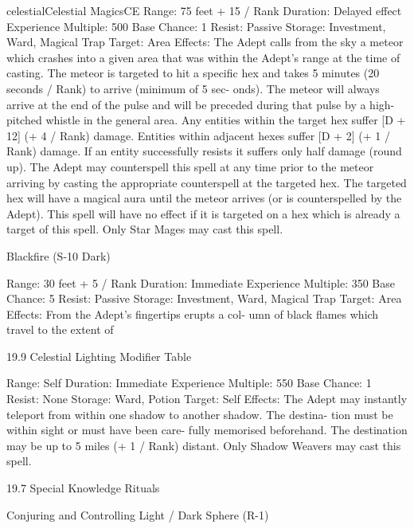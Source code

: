 \begin{College}[1.3]{celestial}{Celestial Magics}{CE}
Range: 75 feet + 15 / Rank 
Duration: Delayed effect 
Experience Multiple: 500 
Base Chance: 1%
Resist: Passive 
Storage: Investment, Ward, Magical Trap 
Target: Area 
Effects:  The  Adept  calls  from  the  sky  a  meteor 
which crashes into a given area that was within the 
Adept’s range at the time of casting. The meteor is 
targeted  to  hit  a  specific  hex  and  takes  5  minutes 
(20  seconds  /  Rank)  to  arrive  (minimum  of  5  sec-
onds). The meteor  will always arrive at the end of 
the pulse and will be preceded during that pulse by 
a  high-pitched  whistle  in  the  general  area.  Any 
entities within the target hex suffer [D + 12] (+ 4 / 
Rank)  damage.  Entities  within  adjacent  hexes 
suffer  [D  +  2]  (+  1  /  Rank)  damage.  If  an  entity 
successfully  resists  it  suffers  only  half  damage 
(round  up).  The  Adept  may  counterspell  this  spell 
at any time prior to the meteor arriving by casting 
the  appropriate  counterspell  at  the  targeted  hex. 
The targeted hex will have a magical aura until the 
meteor arrives (or is counterspelled by the Adept). 
This  spell  will  have  no  effect  if  it is targeted  on  a 
hex  which  is  already  a  target  of  this  spell.  Only 
Star Mages may cast this spell. 

Blackfire (S-10 Dark) 

Range: 30 feet + 5 / Rank 
Duration: Immediate 
Experience Multiple: 350 
Base Chance: 5%
Resist: Passive 
Storage: Investment, Ward, Magical Trap 
Target: Area 
Effects:  From  the  Adept’s  fingertips  erupts  a  col-
umn  of  black  flames  which  travel  to  the  extent  of 

19.9 Celestial Lighting Modifier Table 

Range: Self 
Duration: Immediate 
Experience Multiple: 550 
Base Chance: 1%
Resist: None 
Storage: Ward, Potion 
Target: Self 
Effects:  The  Adept  may  instantly  teleport  from 
within one shadow to another shadow. The destina-
tion  must  be  within  sight  or  must  have  been  care-
fully  memorised  beforehand.  The  destination  may 
be up to 5 miles (+ 1 / Rank) distant. Only Shadow 
Weavers may cast this spell. 

19.7 Special Knowledge Rituals 

Conjuring and Controlling Light / Dark 
Sphere (R-1) 


\end{College}
